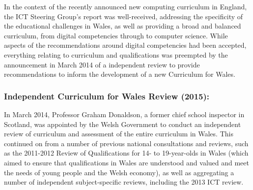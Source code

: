 \documentclass{llncs}
\begin{document}

In the context of the recently announced new computing curriculum in
England, the ICT Steering Group's report was well-received, addressing
the specificity of the educational challenges in Wales, as well as
providing a broad and balanced curriculum, from digital competencies
through to computer science. While aspects
of the recommendations around digital competencies had been accepted,
everything relating to curriculum and qualifications was preempted by
the announcement in March 2014 of a independent review to provide
recommendations to inform the development of a new Curriculum for
Wales.



\subsubsection*{Independent Curriculum for Wales Review (2015):}

In March 2014, Professor Graham Donaldson, a former chief school
inspector in Scotland, was appointed by the Welsh Government to
conduct an independent review of curriculum and assessment %
of the entire curriculum in Wales. This continued on from a number of
previous national consultations and reviews, such as the 2011-2012
Review of Qualifications for 14- to 19-year-olds in Wales (which aimed
to ensure that qualifications in Wales are understood and valued and
meet the needs of young people and the Welsh economy), as well as
aggregating a number of independent subject-specific reviews,
including the 2013 ICT review.
\end{document}
